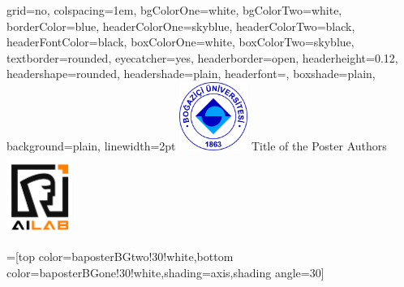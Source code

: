 \documentclass[landscape,final]{baposter}
\begin{document}
\begin{poster}{
  grid=no,
  colspacing=1em,
  bgColorOne=white,
  bgColorTwo=white,
  borderColor=blue,
  headerColorOne=skyblue,
  headerColorTwo=black,
  headerFontColor=black,
  boxColorOne=white,
  boxColorTwo=skyblue,
  textborder=rounded,
  eyecatcher=yes,
  headerborder=open,
  headerheight=0.12\textheight,
  headershape=rounded,
  headershade=plain,
  headerfont=\Large\textsf, %
  boxshade=plain,
  background=plain,
  linewidth=2pt
  }
  {\includegraphics[height=6em]{figures/Bogazici_University_Logo.png}} %
  {\sf \vspace{5pt}%
  Title of the Poster}
  {\sf \Large \vspace{5pt} %
  Authors
  }
  {\includegraphics[height=7em]{figures/ailablogo.png}
  }

  =[top color=baposterBGtwo!30!white,bottom color=baposterBGone!30!white,shading=axis,shading angle=30]

     \newlength{\leftimgwidth}
     \setlength{\leftimgwidth}{0.78em+8.0em}

    \newcommand{\colouredcircle}[1]{%
      \tikz{\useasboundingbox (-0.2em,-0.32em) rectangle(0.2em,0.32em); \draw[draw=black,fill=baposterBGone!80!black!#1!white,line width=0.03em] (0,0) circle(0.18em);}}


\end{poster}
\end{document}

